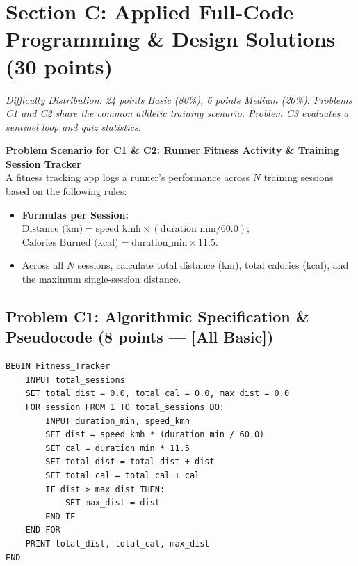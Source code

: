 \documentclass[11pt,a4paper]{article}
\begin{document}
\newpage

\section*{Section C: Applied Full-Code Programming \& Design Solutions (30 points)}
\textit{Difficulty Distribution: 24 points Basic (80\%), 6 points Medium (20\%). Problems C1 and C2 share the common athletic training scenario. Problem C3 evaluates a sentinel loop and quiz statistics.}

\begin{tcolorbox}[colback=boxbg, colframe=secondaryteal, arc=1.2mm, boxrule=0.6pt, left=2.0mm, right=2.0mm, top=0.6mm, bottom=0.6mm]
\textbf{\small Problem Scenario for C1 \& C2: Runner Fitness Activity \& Training Session Tracker}\\[0.1mm]
\footnotesize
A fitness tracking app logs a runner's performance across $N$ training sessions based on the following rules:
\begin{itemize}[itemsep=0.1pt,topsep=0.1pt]
  \item \textbf{Formulas per Session:}
    $\text{Distance (km)} = \text{speed\_kmh} \times (\text{duration\_min} / 60.0)$; \quad
    $\text{Calories Burned (kcal)} = \text{duration\_min} \times 11.5$.
  \item Across all $N$ sessions, calculate total distance (km), total calories (kcal), and the maximum single-session distance.
\end{itemize}
\end{tcolorbox}

\vspace{0.2mm}
\subsection*{Problem C1: Algorithmic Specification \& Pseudocode (8 points --- [All Basic])}

\begin{lstlisting}[language={}]
BEGIN Fitness_Tracker
    INPUT total_sessions
    SET total_dist = 0.0, total_cal = 0.0, max_dist = 0.0
    FOR session FROM 1 TO total_sessions DO:
        INPUT duration_min, speed_kmh
        SET dist = speed_kmh * (duration_min / 60.0)
        SET cal = duration_min * 11.5
        SET total_dist = total_dist + dist
        SET total_cal = total_cal + cal
        IF dist > max_dist THEN:
            SET max_dist = dist
        END IF
    END FOR
    PRINT total_dist, total_cal, max_dist
END
\end{lstlisting}
\end{document}
